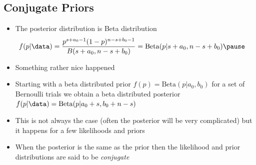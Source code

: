 
\begin{slide}
\section[-2]{Conjugate Priors}

\begin{PauseHighLight}
  \begin{itemize}
  \item The posterior distribution is Beta distribution
    \begin{align*}
      f(p|\data) &= 
      \frac{p^{s+a_0-1} (1-p)^{n-s+b_0-1}}{B(s+a_0,n-s+b_0)} =
                   \mathrm{Beta}(p|s+a_0,n-s+b_0)\pause
    \end{align*}
  \item Something rather nice happened\pause
  \item Starting with a beta distributed prior
    $f(p) = \mathrm{Beta}(p|a_0,b_0)$ for a set of Bernoulli trials we
    obtain a beta distributed posterior
    $f(p|\data) = \mathrm{Beta}(p| a_0+s, b_0+n-s)$\pause
  \item This is not always the case (often the posterior will be very
    complicated) but it happens for a few likelihoods and priors\pause
  \item When the posterior is the same as the prior then the likelihood
    and prior distributions are said to be \emph{conjugate}\pause
  \end{itemize}
\end{PauseHighLight}

\end{slide}



